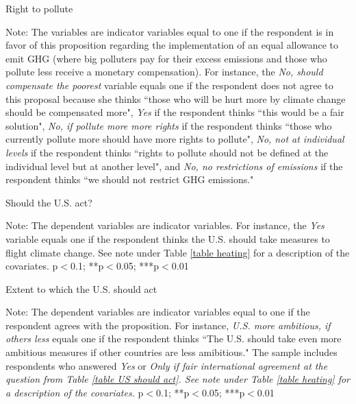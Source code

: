 \documentclass{article}
\begin{document}
\begin{landscape}
	\begin{table}[h!]
	\caption{Right to pollute}
	\begin{center}
		\scalebox{0.6}{}
	\end{center}
	{\footnotesize Note: The variables are indicator variables equal to one if the respondent is in favor of this proposition regarding the implementation of an equal allowance to emit GHG (where big polluters pay for their excess emissions and those who pollute less receive a monetary compensation). For instance, the \textit{No, should compensate the poorest} variable equals one if the respondent does not agree to this proposal because she thinks ``those who will be hurt more by climate change should be compensated more", \textit{Yes} if the respondent thinks ``this would be a fair solution", \textit{No, if pollute more more rights} if the respondent thinks ``those who currently pollute more should have more rights to pollute", \textit{No, not at individual levels} if the respondent thinks ``rights to pollute should not be defined at the individual level but at another level", and \textit{No, no restrictions of emissions} if the respondent thinks ``we should not restrict GHG emissions."}
\end{table}	
\end{landscape}

\begin{table}[h!]
	\caption{Should the U.S. act?} \label{table US should act}
	\begin{center}
		\scalebox{0.7}{}
	\end{center}
	{\footnotesize Note: The dependent variables are indicator variables. For instance, the \textit{Yes} variable equals one if the respondent thinks the U.S. should take measures to flight climate change. See note under Table \ref{table heating} for a description of the covariates.
	\newline *p$<$0.1; **p$<$0.05; ***p$<$0.01}
\end{table}	

\begin{table}[h!]
	\caption{Extent to which the U.S. should act}
	\begin{center}
		\scalebox{0.7}{}
	\end{center}
	{\footnotesize Note: The dependent variables are indicator variables equal to one if the respondent agrees with the proposition. For instance, \textit{U.S. more ambitious, if others less} equals one if the respondent thinks ``The U.S. should take even more ambitious measures if other countries are less amibitious." The sample includes respondents who answered \textit{Yes} or \textit{Only if fair international agreement at the question from Table \ref{table US should act}.   See note under Table \ref{table heating} for a description of the covariates.}
	\newline *p$<$0.1; **p$<$0.05; ***p$<$0.01}
\end{table}	
\end{document}
